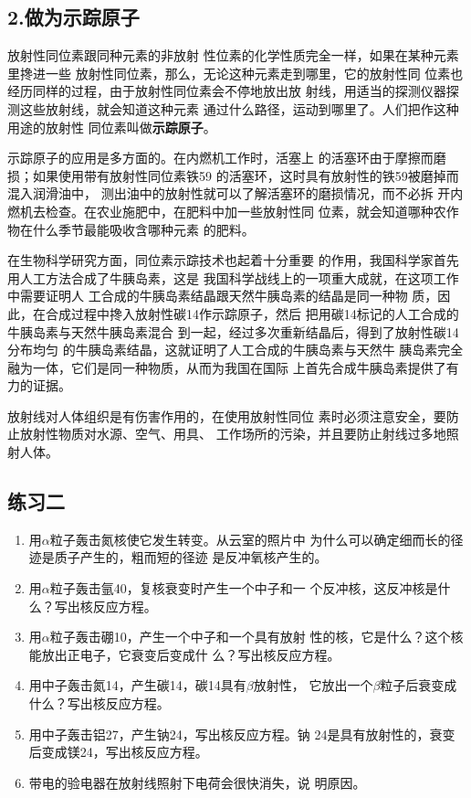 \subsection*{2.做为示踪原子}

放射性同位素跟同种元素的非放射
性位素的化学性质完全一样，如果在某种元素里搀进一些
放射性同位素，那么，无论这种元素走到哪里，它的放射性同
位素也经历同样的过程，由于放射性同位素会不停地放出放
射线，用适当的探测仪器探测这些放射线，就会知道这种元素
通过什么路径，运动到哪里了。人们把作这种用途的放射性
同位素叫做\textbf{示踪原子}。

示踪原子的应用是多方面的。在内燃机工作时，活塞上
的活塞环由于摩擦而磨损；如果使用带有放射性同位素铁59
的活塞环，这时具有放射性的铁59被磨掉而混入润滑油中，
测出油中的放射性就可以了解活塞环的磨损情况，而不必拆
开内燃机去检查。在农业施肥中，在肥料中加一些放射性同
位素，就会知道哪种农作物在什么季节最能吸收含哪种元素
的肥料。

在生物科学研究方面，同位素示踪技术也起着十分重要
的作用，我国科学家首先用人工方法合成了牛胰岛素，这是
我国科学战线上的一项重大成就，在这项工作中需要证明人
工合成的牛胰岛素结晶跟天然牛胰岛素的结晶是同一种物
质，因此，在合成过程中搀入放射性碳14作示踪原子，然后
把用碳14标记的人工合成的牛胰岛素与天然牛胰岛素混合
到一起，经过多次重新结晶后，得到了放射性碳14分布均匀
的牛胰岛素结晶，这就证明了人工合成的牛胰岛素与天然牛
胰岛素完全融为一体，它们是同一种物质，从而为我国在国际
上首先合成牛胰岛素提供了有力的证据。

放射线对人体组织是有伤害作用的，在使用放射性同位
素时必须注意安全，要防止放射性物质对水源、空气、用具、
工作场所的污染，并且要防止射线过多地照射人体。


\subsection*{练习二}

\begin{enumerate}
    \item 用$\alpha$粒子轰击氮核使它发生转变。从云室的照片中
    为什么可以确定细而长的径迹是质子产生的，粗而短的径迹
    是反冲氧核产生的。
    \item 用$\alpha$粒子轰击氩40，复核衰变时产生一个中子和一
    个反冲核，这反冲核是什么？写出核反应方程。
    \item 用$\alpha$粒子轰击硼10，产生一个中子和一个具有放射
    性的核，它是什么？这个核能放出正电子，它衰变后变成什
    么？写出核反应方程。
    \item 用中子轰击氮14，产生碳14，碳14具有$\beta$放射性，
    它放出一个$\beta$粒子后衰变成什么？写出核反应方程。
    \item 用中子轰击铝27，产生钠24，写出核反应方程。钠
    24是具有放射性的，衰变后变成镁24，写出核反应方程。
    \item 带电的验电器在放射线照射下电荷会很快消失，说
    明原因。
\end{enumerate}


